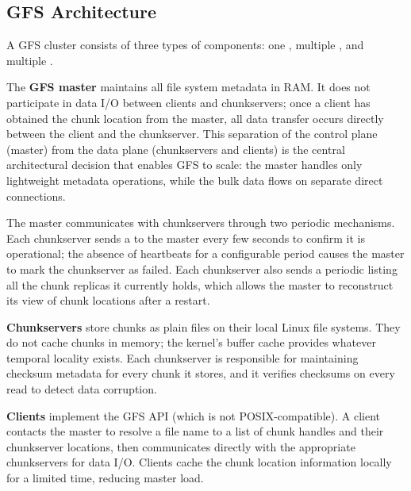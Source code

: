 \subsection{GFS Architecture}
\label{subsec:gfs-arch}

A GFS cluster consists of three types of components: one , multiple , and multiple .

The \textbf{GFS master} maintains all file system metadata in RAM. It
does not participate in data I/O between clients and chunkservers; once
a client has obtained the chunk location from the master, all data
transfer occurs directly between the client and the chunkserver. This
separation of the control plane (master) from the data plane
(chunkservers and clients) is the central architectural decision that
enables GFS to scale: the master handles only lightweight metadata
operations, while the bulk data flows on separate direct connections.

The master communicates with chunkservers through two periodic
mechanisms. Each chunkserver sends a  to the master
every few seconds to confirm it is operational; the absence of
heartbeats for a configurable period causes the master to mark the
chunkserver as failed. Each chunkserver also sends a periodic
 listing all the chunk replicas it currently holds,
which allows the master to reconstruct its view of chunk locations
after a restart.

\textbf{Chunkservers} store chunks as plain files on their local Linux
file systems. They do not cache chunks in memory; the kernel's buffer
cache provides whatever temporal locality exists. Each chunkserver is
responsible for maintaining checksum metadata for every chunk it stores,
and it verifies checksums on every read to detect data corruption.

\textbf{Clients} implement the GFS API (which is not POSIX-compatible).
A client contacts the master to resolve a file name to a list of chunk
handles and their chunkserver locations, then communicates directly
with the appropriate chunkservers for data I/O. Clients cache the
chunk location information locally for a limited time, reducing
master load.

